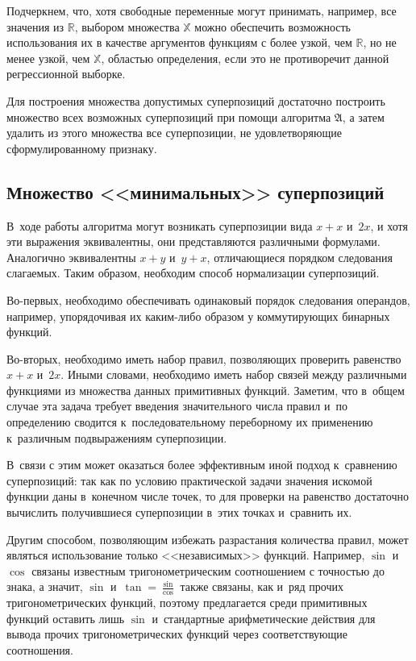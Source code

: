 \documentclass[12pt,a4paper]{amsart}
\begin{document}
Подчеркнем, что, хотя свободные переменные могут принимать, например, все
значения из $\mathbb{R}$, выбором множества $\mathbb{X}$ можно обеспечить
возможность использования их в качестве аргументов функциям с более узкой,
чем $\mathbb{R}$, но не менее узкой, чем $\mathbb{X}$, областью определения,
если это не противоречит данной регрессионной выборке.

Для построения множества допустимых суперпозиций достаточно построить
множество всех возможных суперпозиций при помощи алгоритма $\mathfrak{A}$,
а затем удалить из этого множества все суперпозиции, не удовлетворяющие
сформулированному признаку.

\subsection{Множество <<минимальных>> суперпозиций}

В~ходе работы алгоритма могут возникать суперпозиции вида $x + x$ и~$2x$,
и хотя эти выражения эквивалентны, они представляются различными формулами.
Аналогично эквивалентны $x + y$ и~$y + x$, отличающиеся порядком следования
слагаемых. Таким образом, необходим способ нормализации суперпозиций.

Во-первых, необходимо обеспечивать одинаковый порядок следования операндов,
например, упорядочивая их каким-либо образом у коммутирующих бинарных функций.

Во-вторых, необходимо иметь набор правил, позволяющих проверить равенство
$x + x$ и~$2x$. Иными словами, необходимо иметь набор связей между различными
функциями из множества данных примитивных функций. Заметим, что в~общем
случае эта задача требует введения значительного числа правил и~по определению
сводится к~последовательному переборному их применению к~различным
подвыражениям суперпозиции.

В~связи с этим может оказаться более эффективным иной подход к~сравнению
суперпозиций: так как по условию практической задачи значения искомой функции
даны в~конечном числе точек, то для проверки на равенство достаточно вычислить
получившиеся суперпозиции в~этих точках и~сравнить их.

Другим способом, позволяющим избежать разрастания количества правил, может
являться использование только <<независимых>> функций. Например, $\sin$ и
$\cos$ связаны известным тригонометрическим соотношением с точностью до знака,
а значит, $\sin$ и~$\tan = \frac{\sin}{\cos}$ также связаны, как и~ряд прочих
тригонометрических функций, поэтому предлагается среди примитивных функций
оставить лишь $\sin$ и~стандартные арифметические действия для вывода прочих
тригонометрических функций через соответствующие соотношения.
\end{document}
